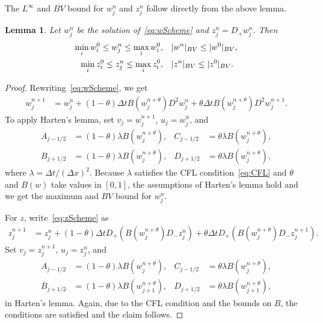\documentclass[11pt,leqno]{amsart}
\newtheorem{lemma}{Lemma}[section]
\newcommand{\Dp}{D_+}
\newcommand{\Dm}{D_-}
\newcommand{\DD}{D^2}
\newcommand{\normBV}[1]{\abs{#1}_{BV}}
\DeclarePairedDelimiter\abs{\lvert}{\rvert}
\begin{document}
The $L^\infty$ and $BV$ bound for $w^n_j$ and $z^n_j$ follow directly from the above lemma.
\begin{lemma}\label{lem:bounds}
  Let $w^n_j$ be the solution of~\eqref{eq:wScheme} and $z^n_j=\Dp w^n_j$. Then
\begin{align*}
  \min_i w^0_i\le w^n_j\le \max_i w^0_i, \quad&\normBV{w^n}\le \normBV{w^0}, \\
\min_i z^0_i\le z^n_j\le \max_i z^0_i, \quad&\normBV{z^n}\le \normBV{z^0}.
\end{align*}
\end{lemma}
\begin{proof}
  Rewriting~\eqref{eq:wScheme}, we get
\begin{align*}
  w^{n+1}_j&=w^n_j+(1-\theta)\Delta t B(w^{n+\theta}_j)\DD w^n_j+\theta \Delta t B(w^{n+\theta}_j)\DD w^{n+1}_j.
\end{align*}
To apply Harten's lemma, set $v_j=w^{n+1}_j$, $u_j=w^n_j$, and
\begin{align*}
  A_{j-1/2}&=(1-\theta)\lambda B(w^{n+\theta}_j),&C_{j-1/2}&=\theta\lambda B(w^{n+\theta}_j),\\ 
  B_{j+1/2}&=(1-\theta)\lambda B(w^{n+\theta}_j),&D_{j+1/2}&=\theta\lambda B(w^{n+\theta}_j),
\end{align*}
where $\lambda=\Delta t/(\Delta x)^2$. Because $\lambda$ satisfies the CFL condition~\eqref{eq:CFL} and  $\theta$ and $B(w)$ take values in $[0,1]$, the assumptions of Harten's lemma hold and we get the maximum and $BV$ bound for $w^n_j$.

For $z$, write~\eqref{eq:zScheme} as
\begin{align*}
    z^{n+1}_j&=z^n_j + (1-\theta)\Delta t \Dp (B(w^{n+\theta}_j) \Dm z^n_j) +\theta \Delta t \Dp (B(w^{n+\theta}_j) \Dm z^{n+1}_j).
\end{align*} 
Set $v_j=z^{n+1}_j$, $u_j=z^n_j$, and
\begin{align*}
  A_{j-1/2}&=(1-\theta)\lambda B(w^{n+\theta}_j),&C_{j-1/2}&=\theta\lambda B(w^{n+\theta}_j),\\ 
  B_{j+1/2}&=(1-\theta)\lambda B(w^{n+\theta}_{j+1}),& D_{j+1/2}&=\theta\lambda B(w^{n+\theta}_{j+1}),
\end{align*}
in Harten's lemma. Again, due to the CFL condition and the bounds on $B$, the conditions are satisfied and the claim follows.
\end{proof}
\end{document}
